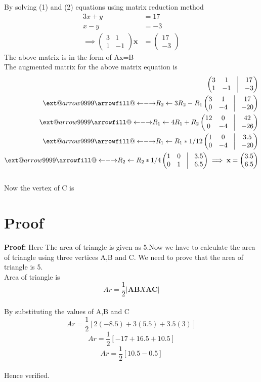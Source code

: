 \documentclass[10pt,a4paper]{report}
\makeatletter
\newcommand\xleftrightarrow[2][]{%
  \ext@arrow 9999{\longleftrightarrowfill@}{#1}{#2}}
\newcommand\longleftrightarrowfill@{%
  \arrowfill@\leftarrow\relbar\rightarrow}
\newcommand{\myvec}[1]{\ensuremath{\begin{pmatrix}#1\end{pmatrix}}}
\let\vec\mathbf
\makeatother
\begin{document}
\begin{multicols}{2}
		   By solving (1) and (2) equations using matrix reduction method\\
		    \begin{align}
			    3x  +y &= 17
			    \\
			    x -y  &= -3
			    \\
			    \implies 
			    \myvec{3 &  1 
			    \\
			    1 & -1 }\vec{x} &= \myvec{17 \\ -3}
		    \end{align}
		    The above matrix is in the form of Ax=B\\
		    The augmented matrix for the above matrix equation is 
		    \begin{align}
			    \myvec{
				    3 & 1 & \vrule & 17
			    \\
			    1 & -1  &\vrule & -3
		    }
		    \\
		    \xleftrightarrow[]{R_2 \leftarrow 3R_2 -R_1 }
			    \myvec{
				    3 & 1 & \vrule & 17
			    \\
			    0 & -4  &\vrule & -20
		    }
		    \\
		    \xleftrightarrow[]{R_1 \leftarrow 4R_1 +R_2 }  
			    \myvec{
				    12 & 0 & \vrule & 42
			    \\
			    0 & -4  &\vrule & -26
		    }
		    \\
		     \xleftrightarrow[]{R_1 \leftarrow R_1* 1 /12 }
			    \myvec{
				    1 & 0 & \vrule & 3.5
			    \\
			    0 & -4  &\vrule & -20
			    }
			    \\
			     \xleftrightarrow[]{R_2 \leftarrow R_2* 1 /4 }
			    \myvec{
				    1 & 0 & \vrule & 3.5
			    \\
			    0 & 1  &\vrule & 6.5
			    }
			    \implies \vec{x} = \myvec{3.5 \\ 6.5}
\end{align}
		    \\
		    Now the vertex of C is
		    \begin{center}
		    \end{center}
		    
		  
		   
 \section{Proof}
 \textbf{Proof:}
Here The area of triangle is given as 5.Now we have to calculate the area of triangle using three vertices A,B and C. We need to prove that the area of triangle is 5.
\\Area of triangle is
{ $$ Ar=\frac{1}{2}\left| \vec{AB}X\vec{AC} \right| $$}
\\By substituting the values of A,B and C\\
{ $$ Ar=\frac{1}{2}[2(-8.5)+3(5.5)+3.5(3)] $$ }
{ $$ Ar=\frac{1}{2}[-17+16.5+10.5] $$ }
{ $$ Ar=\frac{1}{2}[10.5-0.5] $$ }
\centering
{}
\\Hence verified.
\end{multicols}
\end{document}

